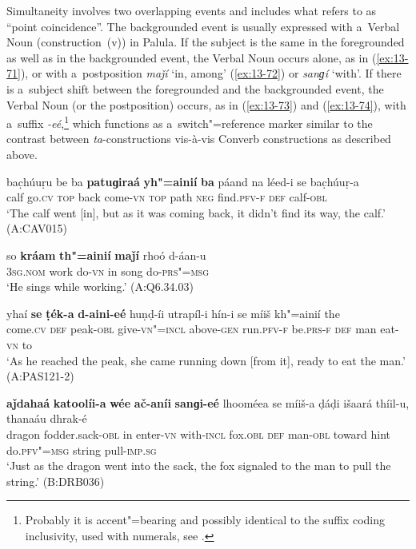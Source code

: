  Simultaneity involves two overlapping events and includes what
\citet[330]{givon2001b} refers to as ``point coincidence''. The backgrounded event
\citep[254--255]{thompsonetal2007} is usually expressed with a~Verbal Noun (construction~(v)) in
Palula. If the subject is the same in the foregrounded as well as in the backgrounded event, the
Verbal Noun occurs alone, as in (\ref{ex:13-71}), or with a~postposition \textit{maǰí} `in,
among' (\ref{ex:13-72}) or \textit{sanɡí} `with'. If there is a~subject shift between
the foregrounded and the backgrounded event, the Verbal Noun (or the postposition) occurs, as in
(\ref{ex:13-73}) and (\ref{ex:13-74}), with a~suffix \textit{-eé},\footnote{Probably it is accent"=bearing and possibly identical to the suffix coding inclusivity, used with numerals, see .} which functions as a~switch"=reference marker similar to the contrast between
\textit{ta}-constructions vis-à-vis Converb constructions as described above.

\begin{exe}
\ex
\label{ex:13-71}
\gll bac̣húuṛu be ba \textbf{patuɡiraá} \textbf{yh"=ainií} \textbf{ba} páand na léed-i se bac̣húuṛ-a \\
calf go.\textsc{cv} \textsc{top} back come-\textsc{vn }  \textsc{top} path \textsc{neg} find.\textsc{pfv-f} \textsc{def} calf-\textsc{obl}  \\
\glt `The calf went [in], but as it was coming back, it didn't find its way, the calf.' (A:CAV015)

\ex
\label{ex:13-72}
\gll so \textbf{kráam} \textbf{th"=ainií} \textbf{maǰí} rhoó d-áan-u  \\
\textsc{3sg.nom} work do-\textsc{vn} in song do-\textsc{prs"=msg}  \\
\glt `He sings while working.' (A:Q6.34.03)

\ex
\label{ex:13-73}
\gll yhaí \textbf{se} \textbf{ṭék-a} \textbf{d-aini-eé} huṇḍ-íi utrapíl-i hín-i se míiš kh"=ainií the \\
come.\textsc{cv} \textsc{def} peak-\textsc{obl} give-\textsc{vn"=incl} above-\textsc{gen} run.\textsc{pfv-f}  be.\textsc{prs-f } \textsc{def} man eat-\textsc{vn} to  \\
\glt `As he reached the peak, she came running down [from it], ready to eat the man.' (A:PAS121-2)

\ex
\label{ex:13-74}
\gll \textbf{aǰdahaá} \textbf{katoolíi-a} \textbf{wée} \textbf{ač-aníi} \textbf{sanɡi-eé} lhooméea se míiš-a ḍáḍi išaará thíil-u, thanaáu dhrak-é \\
dragon fodder.sack-\textsc{obl} in enter-\textsc{vn} with-\textsc{incl}  fox.\textsc{obl} \textsc{def} man-\textsc{obl} toward hint do.\textsc{pfv"=msg} string pull-\textsc{imp.sg}  \\
\glt `Just as the dragon went into the sack, the fox signaled to the man to pull the string.' (B:DRB036)
\end{exe}

